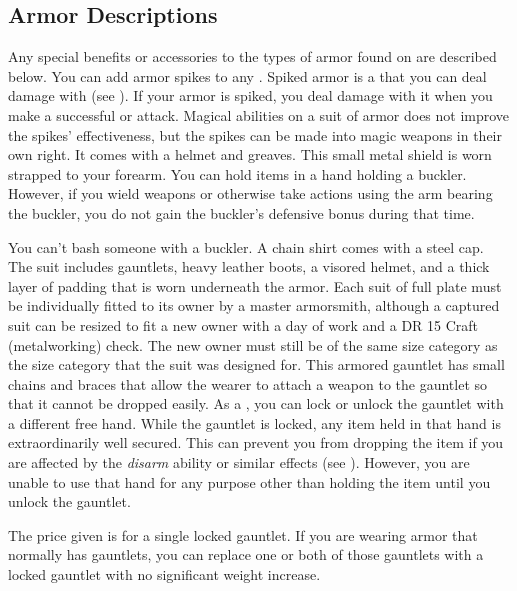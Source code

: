     \subsection{Armor Descriptions}
        Any special benefits or accessories to the types of armor found on  are described below.
         You can add armor spikes to any .
        Spiked armor is a  that you can deal damage with (see ).
        If your armor is spiked, you deal damage with it when you make a successful  or  attack.
        Magical abilities on a suit of armor does not improve the spikes' effectiveness, but the spikes can be made into magic weapons in their own right.
         It comes with a helmet and greaves.
         This small metal shield is worn strapped to your forearm.
        You can hold items in a hand holding a buckler.
        However, if you wield weapons or otherwise take actions using the arm bearing the buckler, you do not gain the buckler's defensive bonus during that time.
        \par You can't bash someone with a buckler.
         A chain shirt comes with a steel cap.
         The suit includes gauntlets, heavy leather boots, a visored helmet, and a thick layer of padding that is worn underneath the armor. Each suit of full plate must be individually fitted to its owner by a master armorsmith, although a captured suit can be resized to fit a new owner with a day of work and a DR 15 Craft (metalworking) check. The new owner must still be of the same size category as the size category that the suit was designed for.
         This armored gauntlet has small chains and braces that allow the wearer to attach a weapon to the gauntlet so that it cannot be dropped easily.
        As a , you can lock or unlock the gauntlet with a different free hand.
        While the gauntlet is locked, any item held in that hand is extraordinarily well secured.
        This can prevent you from dropping the item if you are affected by the \textit{disarm} ability or similar effects (see ).
        However, you are unable to use that hand for any purpose other than holding the item until you unlock the gauntlet.
        \par The price given is for a single locked gauntlet.
        If you are wearing armor that normally has gauntlets, you can replace one or both of those gauntlets with a locked gauntlet with no significant weight increase.
